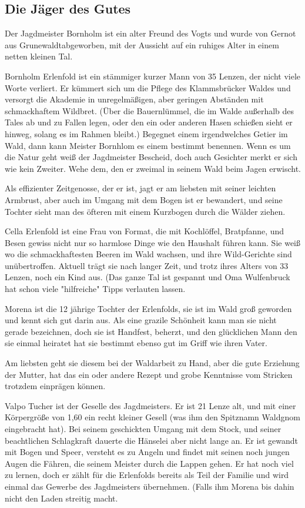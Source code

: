 \subsection{Die Jäger des Gutes}
Der Jagdmeister Bornholm ist ein alter Freund des Vogts und wurde von Gernot aus Grunewaldtabgeworben, mit der Aussicht auf ein ruhiges Alter in einem netten kleinen Tal.

Bornholm Erlenfold ist ein stämmiger kurzer Mann von 35 Lenzen, der nicht viele Worte verliert. Er kümmert sich um die Pflege des Klammsbrücker Waldes und versorgt die Akademie in unregelmäßigen, aber geringen Abständen mit schmackhaftem Wildbret. (Über die Bauernlümmel, die im Walde außerhalb des Tales ab und zu Fallen legen, oder den ein oder anderen Hasen schießen sieht er hinweg, solang es im Rahmen bleibt.) Begegnet einem irgendwelches Getier im Wald, dann kann Meister Bornhlom es einem bestimmt benennen. Wenn es um die Natur geht weiß der Jagdmeister Bescheid, doch auch Gesichter merkt er sich wie kein Zweiter. Wehe dem, den er zweimal in seinem Wald beim Jagen erwischt.

Als effizienter Zeitgenosse, der er ist, jagt er am liebsten mit seiner leichten Armbrust, aber auch im Umgang mit dem Bogen ist er bewandert, und seine Tochter sieht man des öfteren mit einem Kurzbogen durch die Wälder ziehen.

Cella Erlenfold ist eine Frau von Format, die mit Kochlöffel, Bratpfanne, und Besen gewiss nicht nur so harmlose Dinge wie den Haushalt führen kann. Sie weiß wo die schmackhaftesten Beeren im Wald wachsen, und ihre Wild-Gerichte sind unübertroffen. Aktuell trägt sie nach langer Zeit, und trotz ihres Alters von 33 Lenzen, noch ein Kind aus. (Das ganze Tal ist gespannt und Oma Wulfenbruck hat schon viele "hilfreiche" Tipps verlauten lassen.

Morena ist die 12 jährige Tochter der Erlenfolds, sie ist im Wald groß geworden und kennt sich gut darin aus. Als eine grazile Schönheit kann man sie nicht gerade bezeichnen, doch sie ist Handfest, beherzt, und den glücklichen Mann den sie einmal heiratet hat sie bestimmt ebenso gut im Griff wie ihren Vater.

Am liebsten geht sie diesem bei der Waldarbeit zu Hand, aber die gute Erziehung der Mutter, hat das ein oder andere Rezept und grobe Kenntnisse vom Stricken trotzdem einprägen können.

Valpo Tucher ist der Geselle des Jagdmeisters. Er ist 21 Lenze alt, und mit einer Körpergröße von 1,60 ein recht kleiner Gesell (was ihm den Spitznamn Waldgnom eingebracht hat). Bei seinem geschickten Umgang mit dem Stock, und seiner beachtlichen Schlagkraft dauerte die Hänselei aber nicht lange an. Er ist gewandt mit Bogen und Speer, versteht es zu Angeln und findet mit seinen noch jungen Augen die Fähren, die seinem Meister durch die Lappen gehen. Er hat noch viel zu lernen, doch er zählt für die Erlenfolds bereits als Teil der Familie und wird einmal das Gewerbe des Jagdmeisters übernehmen. (Falls ihm Morena bis dahin nicht den Laden streitig macht.

